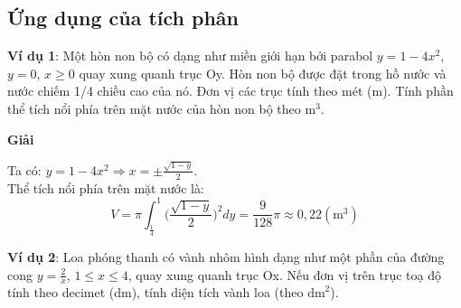 \documentclass[13pt]{article}
\begin{document}
\subsection{Ứng dụng của tích phân}
\par\textbf{Ví dụ 1}: Một hòn non bộ có dạng như miền giới hạn bởi parabol $y=1-4x^2$, $y=0$, $x\geq0$ quay xung quanh trục Oy. Hòn non bộ được đặt trong hồ nước và nước chiếm 1/4 chiều cao của nó. Đơn vị các trục tính theo mét (m). Tính phần thể tích nổi phía trên mặt nước của hòn non bộ theo $\text{m}^3$.\\
\begin{minipage}{7cm}
\begin{center}
\end{center}
\end{minipage}
\begin{minipage}{7cm}
\end{minipage}
\centerline{\textbf{Giải}}
Ta có: $y=1-4x^2\Rightarrow x=\pm\frac{\sqrt{1-y}}{2}$.\\
Thể tích nổi phía trên mặt nước là: $$V=\pi\int_\frac14^1\bigg(\frac{\sqrt{1-y}}{2}\bigg)^2dy=\frac9{128}\pi\approx0,22(\text{m}^3)$$
\par\textbf{Ví dụ 2}: Loa phóng thanh có vành nhôm hình dạng như một phần của đường cong $y=\frac2x$, $1\leq x\leq4$, quay xung quanh trục Ox. Nếu đơn vị trên trục toạ độ tính theo decimet (dm), tính diện tích vành loa (theo $\text{dm}^2$).\\
\end{document}
